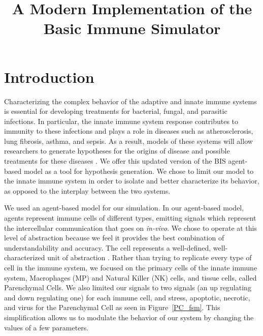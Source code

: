 \documentclass[10pt,conference]{IEEEtran}
\begin{document}
\title{A Modern Implementation of the \\
Basic Immune Simulator}

\author{
}

\maketitle
\thispagestyle{plain}
\pagestyle{plain}

\section{Introduction}
\noindent
Characterizing the complex behavior of the adaptive and innate immune systems is essential for developing treatments for bacterial, fungal, 
and parasitic infections. In particular, the innate immune system response contributes to immunity to these infections and plays a role in 
diseases such  
as atherosclerosis, lung fibrosis, asthma, and sepsis. As a result, models of these systems will allow researchers to generate hypotheses for 
the origins of disease and possible treatments for these diseases \cite{Folcik:2007}. We offer this updated version of the BIS agent-based 
model 
as a tool for hypothesis generation. We chose to limit our model to the innate immune system in order to isolate and better characterize its 
behavior, as opposed to the interplay between the two systems.

\indent
We used an agent-based model for our simulation. In our agent-based model, agents represent immune cells of 
different types, emitting signals which represent the intercellular 
communication that goes on \textit{in-vivo}. We chose to operate at this level of abstraction because we feel it provides the best combination 
of understandability and accuracy. The cell represents a well-defined, well-characterized unit of abstraction \cite{Folcik:2007}.  Rather than 
trying to replicate every type of cell in the immune system, we 
focused on the primary cells of the innate immune system, 
Macrophages (MP) and Natural Killer (NK) cells, and tissue cells, called Parenchymal Cells. We also limited our signals to two signals (an up 
regulating and down regulating one) for each immune cell, and stress, apoptotic, necrotic, and virus for the Parenchymal Cell as seen in 
Figure~\ref{PC_fsm}. This simplification allows us to modulate the behavior of our system by changing the values of a few parameters.
\end{document}
